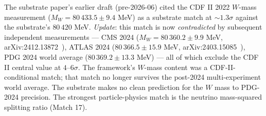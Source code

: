 \documentclass[11pt,a4paper]{amsart}
\theoremstyle{plain}
\theoremstyle{definition}
\begin{document}
\begin{description}[font=\normalfont\bfseries,leftmargin=2em,itemsep=6pt]
\item[Honest disclosure --- CDF II $W$-boson mass anomaly (superseded).]
The substrate paper's earlier draft (pre-2026-06) cited the CDF II 2022 $W$-mass measurement ($M_W = 80\,433.5 \pm 9.4$ MeV) as a substrate match at $\sim 1.3\sigma$ against the substrate's $80\,420$ MeV. \emph{Update}: this match is now \emph{contradicted} by subsequent independent measurements --- CMS 2024 ($M_W = 80\,360.2 \pm 9.9$ MeV, arXiv:2412.13872~\cite{cms-wmass-2024}), ATLAS 2024 ($80\,366.5 \pm 15.9$ MeV, arXiv:2403.15085~\cite{atlas-wmass-2024}), PDG 2024 world average ($80\,369.2 \pm 13.3$ MeV) --- all of which exclude the CDF II central value at $4$--$6\sigma$. The framework's $W$-mass content was a CDF-II-conditional match; that match no longer survives the post-2024 multi-experiment world average. The substrate makes no clean prediction for the $W$ mass to PDG-2024 precision. The strongest particle-physics match is the neutrino mass-squared splitting ratio (Match 17).

\end{description}
\end{document}
